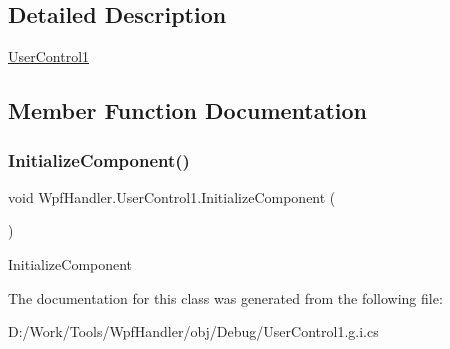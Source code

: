 \subsection{Detailed Description}
\mbox{\hyperlink{class_wpf_handler_1_1_user_control1}{User\+Control1}} 



\subsection{Member Function Documentation}
\mbox{\label{class_wpf_handler_1_1_user_control1_a4be9da09a92a3fd301a67bf224d2f3d5}} 
\subsubsection{\texorpdfstring{Initialize\+Component()}{InitializeComponent()}}
{\footnotesize\ttfamily void Wpf\+Handler.\+User\+Control1.\+Initialize\+Component (\begin{DoxyParamCaption}{ }\end{DoxyParamCaption})}



Initialize\+Component 



The documentation for this class was generated from the following file\+:\begin{DoxyCompactItemize}
\item 
D\+:/\+Work/\+Tools/\+Wpf\+Handler/obj/\+Debug/User\+Control1.\+g.\+i.\+cs\end{DoxyCompactItemize}
